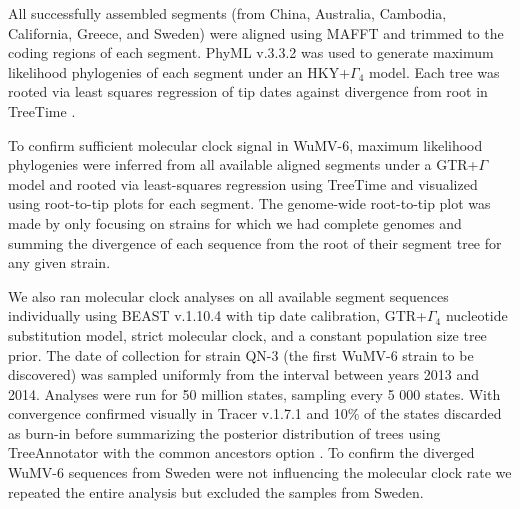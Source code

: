 \documentclass[11pt]{article}
\begin{document}
All successfully assembled segments (from China, Australia, Cambodia, California, Greece, and Sweden) were aligned using MAFFT \citep{katoh_mafft_2005} and trimmed to the coding regions of each segment.
PhyML v.3.3.2 was used to generate maximum likelihood phylogenies of each segment under an HKY+$\Gamma_{4}$ \citep{hasegawa_dating_1985,yang_maximum_1994} model.
Each tree was rooted via least squares regression of tip dates against divergence from root in TreeTime \citep{sagulenko_treetime_2018}.

To confirm sufficient molecular clock signal in WuMV-6, maximum likelihood phylogenies \citep{stamatakis_raxml_2014} were inferred from all available aligned segments under a GTR+$\Gamma$ model and rooted via least-squares regression using TreeTime \citep{sagulenko_treetime_2018} and visualized using root-to-tip plots for each segment.
The genome-wide root-to-tip plot was made by only focusing on strains for which we had complete genomes and summing the divergence of each sequence from the root of their segment tree for any given strain.

We also ran molecular clock analyses on all available segment sequences individually using BEAST v.1.10.4 \citep{suchard_bayesian_2018} with tip date calibration, GTR+$\Gamma_{4}$ nucleotide substitution model, strict molecular clock, and a constant population size tree prior.
The date of collection for strain QN-3 (the first WuMV-6 strain to be discovered) was sampled uniformly from the interval between years 2013 and 2014.
Analyses were run for 50 million states, sampling every 5 000 states.
With convergence confirmed visually in Tracer v.1.7.1 \citep{rambaut_posterior_2018} and 10\% of the states discarded as burn-in before summarizing the posterior distribution of trees using TreeAnnotator with the common ancestors option \citep{heled_looking_2013}.
To confirm the diverged WuMV-6 sequences from Sweden were not influencing the molecular clock rate we repeated the entire analysis but excluded the samples from Sweden.
\end{document}
